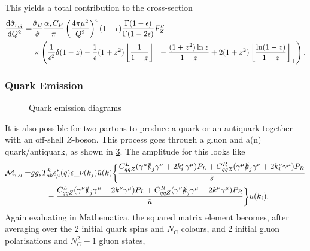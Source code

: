 \documentclass[../main.tex]{subfiles}
\begin{document}
This yields a total contribution to the cross-section
\begin{align}
  \nonumber
  \d[Q^2]{\hat\sigma_{r,g}} = & \frac{\hat\sigma_B}{\hat{\sigma}} \frac{\alpha_s C_F}{\pi} \pclosed{\frac{4\pi \mu^2}{Q^2}}^{\epsilon} (1-\epsilon) \frac{\Gamma(1-\epsilon)}{\Gamma(1-2\epsilon)} F^{\prime\prime}_Z \\
                              & \times \pclosed{\frac{1}{\epsilon^2} \delta(1-z) - \frac{1}{\epsilon} (1+z^2)\plusdist{\frac{1}{1-z}} - \frac{(1+z^2)\ln z}{1-z} + 2(1+z^2)\plusdist{\frac{\ln(1-z)}{1-z}}}.
\end{align}

\subsubsection*{Quark Emission}
\begin{figure}[ht!]
  \centering
  \begin{subfigure}{0.49\textwidth}
    \centering
    \caption{}
    \label{pc:subfig:quark_emission_s}
  \end{subfigure}
  \begin{subfigure}{0.49\textwidth}
    \centering
    \caption{}
    \label{pc:subfig:quark_emission_t}
  \end{subfigure}
  \caption{Quark emission diagrams}
  \label{pc:fig:quark_emission}
\end{figure}
It is also possible for two partons to produce a quark or an antiquark together with an off-shell \(Z\)-boson.
This process goes through a gluon and a(n) quark/antiquark, as shown in \cref{pc:fig:quark_emission}.
The amplitude for this looks like
\begin{align}
  \nonumber
  \M_{r,q} = & g g_s T_{ab}^k \epsilon_\mu^\ast(q) \epsilon\_\nu(k_j) \bar{u}(k) \biggl\{
  \frac{C_{qqZ}^L (\gamma\^\mu \slashed{k}_j \gamma\^\nu + 2k_i^\nu \gamma\^\mu )P_L + C_{qqZ}^R (\gamma\^\mu \slashed{k}_j \gamma\^\nu + 2k_i^\nu \gamma\^\mu )P_R }{\hat{s}}                     \\
             & \qquad - \frac{C_{qqZ}^L (\gamma\^\nu \slashed{k}_j \gamma\^\mu - 2k\^\nu \gamma\^\mu )P_L + C_{qqZ}^R (\gamma\^\nu \slashed{k}_j \gamma\^\mu - 2k\^\nu \gamma\^\mu )P_R }{\hat{u}}
  \biggr\}u(k_i).
\end{align}
Again evaluating in Mathematica, the squared matrix element becomes, after averaging over the 2 initial quark spins and \(N_C\) colours, and 2 initial gluon polarisations and \(N_C^2-1\) gluon states,
\end{document}
